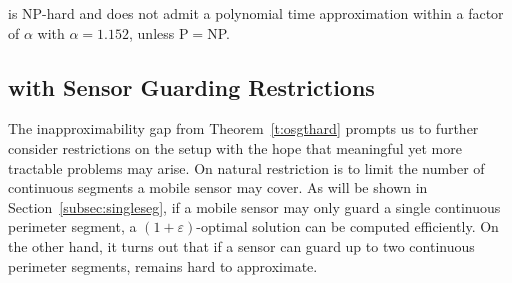\begin{theorem}\label{t:osgthard}
\osgt is NP-hard and does not admit a polynomial time approximation 
within a factor of $\alpha$ with $\alpha = 1.152$, unless 
P$=$NP.
\end{theorem}

\subsection{\opgt with Sensor Guarding Restrictions}\label{subsec:2-seghard}
The inapproximability gap from Theorem~\ref{t:osgthard} prompts us to 
further consider restrictions on the setup with the hope that meaningful 
yet more tractable problems may arise. On natural restriction is to 
limit the number of continuous segments a mobile sensor may cover. As 
will be shown in Section~\ref{subsec:singleseg}, if a mobile sensor may 
only guard a single continuous perimeter segment, a 
$(1 + \varepsilon)$-optimal solution can be computed efficiently. 
On the other hand, it turns out that if a sensor can guard up to two 
continuous perimeter segments, \opgt remains hard to approximate. 

